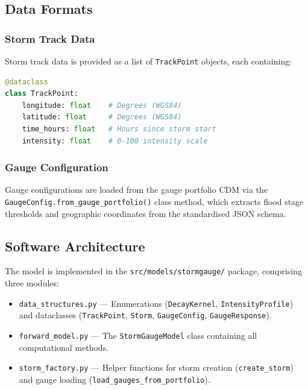 \documentclass[11pt,a4paper]{article}
\begin{document}
\subsection{Data Formats}

\subsubsection{Storm Track Data}
Storm track data is provided as a list of \texttt{TrackPoint} objects, each
containing:
\begin{lstlisting}[language=Python]
@dataclass
class TrackPoint:
    longitude: float    # Degrees (WGS84)
    latitude: float     # Degrees (WGS84)
    time_hours: float   # Hours since storm start
    intensity: float    # 0-100 intensity scale
\end{lstlisting}

\subsubsection{Gauge Configuration}
Gauge configurations are loaded from the gauge portfolio CDM via the
\texttt{GaugeConfig.from\_gauge\_portfolio()} class method, which extracts
flood stage thresholds and geographic coordinates from the standardised JSON
schema.

\mkmimplementation

\subsection{Software Architecture}

The model is implemented in the \texttt{src/models/stormgauge/} package,
comprising three modules:

\begin{itemize}[nosep]
    \item \texttt{data\_structures.py} --- Enumerations (\texttt{DecayKernel},
          \texttt{IntensityProfile}) and dataclasses (\texttt{TrackPoint},
          \texttt{Storm}, \texttt{GaugeConfig}, \texttt{GaugeResponse}).
    \item \texttt{forward\_model.py} --- The \texttt{StormGaugeModel} class
          containing all computational methods.
    \item \texttt{storm\_factory.py} --- Helper functions for storm creation
          (\texttt{create\_storm}) and gauge loading
          (\texttt{load\_gauges\_from\_portfolio}).
\end{itemize}
\end{document}
